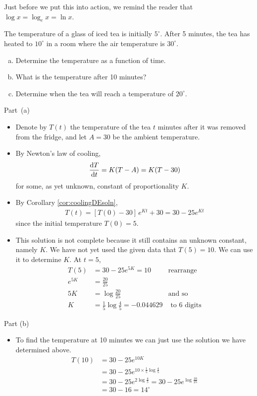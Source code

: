 Just before we put this into action, we remind the reader that $\log x = \log_e x = \ln
x$.
\begin{eg}\label{eg:SDEcoolingA}
The temperature of a glass of iced tea is initially $5^\circ$.
After 5 minutes, the tea has heated to $10^\circ$ in a room where the air
temperature is $30^\circ$.
\begin{enumerate}[(a)]
\item   Determine the temperature as a function of time.
\item   What is the temperature after 10 minutes?
\item  Determine when the tea will reach a temperature of $20^\circ$.
\end{enumerate}

\soln  Part~(a)
\begin{itemize}
 \item Denote by $T(t)$ the temperature of the tea $t$ minutes after it was removed
from the fridge, and let $A=30$ be the ambient temperature.

\item By Newton's law of cooling,
\begin{align*}
\diff{T}{t}=K(T-A) = K(T-30)
\end{align*}
for some, as yet unknown, constant of proportionality $K$.

\item By Corollary \ref{cor:coolingDEsoln},
\begin{align*}
T(t) = [T(0)-30]\,e^{Kt} + 30
      =30-25 e^{Kt}
\end{align*}
since the initial temperature $T(0)=5$.

\item This solution is not complete because it still contains an unknown constant, namely
$K$. We have not yet used the given data that $T(5)=10$. We can use it to determine $K$.
At $t=5$,
\begin{align*}
T(5) &=30-25 e^{5K}=10 & \text{rearrange} \\
e^{5K} &=\frac{20}{25} \\
5K &=\log\frac{20}{25} & \text{and so}\\
K &=\frac{1}{5}\log\frac{4}{5}=-0.044629 & \text{ to 6 digits}
\end{align*}
\end{itemize}

\noindent Part (b)
\begin{itemize}
 \item To find the temperature at 10 minutes we can just use the solution we have
determined above.
\begin{align*}
T(10)&=30-25 e^{10K}\\
  &=30-25 e^{10\times\frac{1}{5}\log\frac{4}{5}} \\
  &=30-25 e^{2\log\frac{4}{5}}  = 30-25 e^{\log\frac{16}{25}}\\
  &=30-16=\text{$14^\circ$}
\end{align*}
\end{itemize}


\end{eg}
